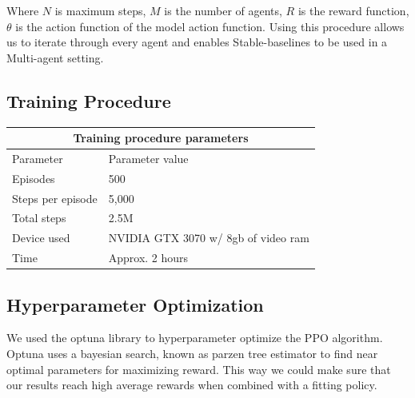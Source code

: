 \documentclass[conference]{IEEEtran}
\begin{document}
\begin{algorithm}[!ht]
\end{algorithm}

Where $N$ is maximum steps, $M$ is the number of agents, $R$ is the reward function, $\theta$ is the action function of the model action function.
Using this procedure allows us to iterate through every agent and enables Stable-baselines to be used in a Multi-agent setting.


\subsection{Training Procedure}
\begin{tabular}{ |p{}||p{}|  }
	\hline
	\multicolumn{2}{|c|}{Training procedure parameters} \\
	\hline
	\hline
	Parameter         & Parameter value\\
	\hline
	Episodes          & 500\\
	\hline
	Steps per episode & 5,000\\
	\hline
	Total steps       & 2.5M\\
	\hline
	\hline
	Device used       & NVIDIA GTX 3070 w/ 8gb of video ram\\
	\hline
	Time              & Approx. 2 hours\\
	\hline
\end{tabular}


\subsection{Hyperparameter Optimization}
We used the optuna library to hyperparameter optimize the PPO algorithm. Optuna uses a bayesian
search, known as parzen tree estimator to find near optimal parameters for maximizing reward. This way we could make sure that our results reach high
average rewards when combined with a fitting policy.
\end{document}
